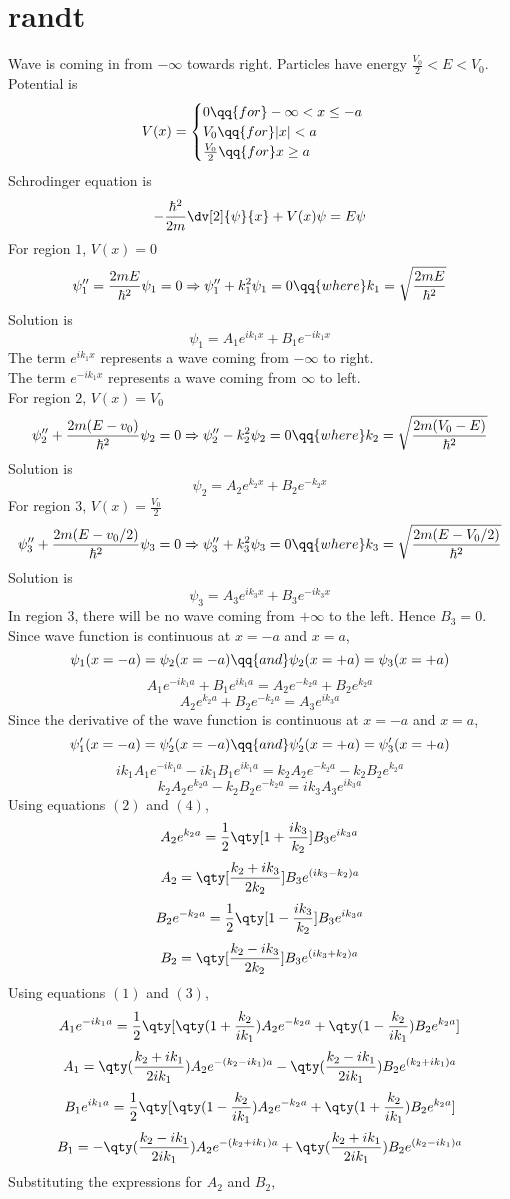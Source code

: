 \section*{randt}
Wave is coming in from $-\infty$ towards right. Particles have energy $\frac{V_0}{2}<E<V_0$.\\
Potential is 
$$
V(x)=
\begin{cases}
0 \qq{for} -\infty < x \le -a \\
V_0 \qq{for} |x|<a\\
\frac{V_0}{2} \qq{for} x\ge a
\end{cases}
$$
Schrodinger equation is
\[-\frac{\hbar^2}{2m}\dv[2]{\psi}{x}+V(x)\psi=E\psi\]
For region $1$, $V(x)=0$\\
\[\psi_1''=\frac{2mE}{\hbar^2}\psi_1=0\Rightarrow\psi_1''+k_1^2\psi_1=0\qq{where}k_1=\sqrt{\frac{2mE}{\hbar^2}}\]
Solution is 
\[\psi_1=A_1e^{ik_1x}+B_1e^{-ik_1x}\]
The term $e^{ik_1x}$ represents a wave coming from $-\infty$ to right.\\
The term $e^{-ik_1x}$ represents a wave coming from $\infty$ to left.\\
For region $2$, $V(x)=V_0$\\
\[\psi_2''+\frac{2m(E-v_0)}{\hbar^2}\psi_2=0\Rightarrow\psi_2''-k_2^2\psi_2=0\qq{where}k_2=\sqrt{\frac{2m(V_0-E)}{\hbar^2}}\]
Solution is 
\[\psi_2=A_2e^{k_2x}+B_2e^{-k_2x}\]
For region $3$, $V(x)=\frac{V_0}{2}$\\
\[\psi_3''+\frac{2m(E-v_0/2)}{\hbar^2}\psi_3=0\Rightarrow\psi_3''+k_3^2\psi_3=0\qq{where}k_3=\sqrt{\frac{2m(E-V_0/2)}{\hbar^2}}\]
Solution is 
\[\psi_3=A_3e^{ik_3x}+B_3e^{-ik_3x}\]
In region $3$, there will be no wave coming from $+\infty$ to the left. Hence $B_3=0$.\\
Since wave function is continuous at $x=-a$ and $x=a$,
\[\psi_1(x=-a)=\psi_2(x=-a)\qq{and}\psi_2(x=+a)=\psi_3(x=+a)\]
\[A_1e^{-ik_1a}+B_1e^{ik_1a}=A_2e^{-k_2a}+B_2e^{k_2a}\tag{1}\]
\[A_2e^{k_2a}+B_2e^{-k_2a}=A_3e^{ik_3a}\tag{2}\]
Since the derivative of the wave function is continuous at $x=-a$ and $x=a$,
\[\psi_1'(x=-a)=\psi_2'(x=-a)\qq{and}\psi_2'(x=+a)=\psi_3'(x=+a)\]
\[ik_1A_1e^{-ik_1a}-ik_1B_1e^{ik_1a}=k_2A_2e^{-k_2a}-k_2B_2e^{k_2a}\tag{3}\]
\[k_2A_2e^{k_2a}-k_2B_2e^{-k_2a}=ik_3A_3e^{ik_3a}\tag{4}\]
Using equations $(2)$ and $(4)$,
\[A_2e^{k_2a}=\frac{1}{2}\qty[1+\frac{ik_3}{k_2}]B_3e^{ik_3a}\]
\[A_2=\qty[\frac{k_2+ik_3}{2k_2}]B_3e^{(ik_3-k_2)a}\]
\[B_2e^{-k_2a}=\frac{1}{2}\qty[1-\frac{ik_3}{k_2}]B_3e^{ik_3a}\]
\[B_2=\qty[\frac{k_2-ik_3}{2k_2}]B_3e^{(ik_3+k_2)a}\]
\newpage
Using equations $(1)$ and $(3)$,
\[A_1e^{-ik_1a}=\frac{1}{2}\qty[\qty(1+\frac{k_2}{ik_1})A_2e^{-k_2a}+\qty(1-\frac{k_2}{ik_1})B_2e^{k_2a}]\]
\[A_1=\qty(\frac{k_2+ik_1}{2ik_1})A_2e^{-(k_2-ik_1)a}-\qty(\frac{k_2-ik_1}{2ik_1})B_2e^{(k_2+ik_1)a}\]
\[B_1e^{ik_1a}=\frac{1}{2}\qty[\qty(1-\frac{k_2}{ik_1})A_2e^{-k_2a}+\qty(1+\frac{k_2}{ik_1})B_2e^{k_2a}]\]
\[B_1=-\qty(\frac{k_2-ik_1}{2ik_1})A_2e^{-(k_2+ik_1)a}+\qty(\frac{k_2+ik_1}{2ik_1})B_2e^{(k_2-ik_1)a}\]
Substituting the expressions for $A_2$ and $B_2$,


